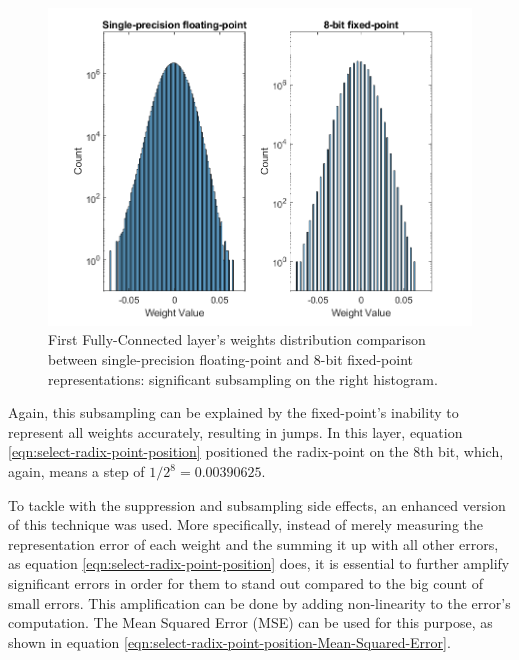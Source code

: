 \begin{figure} [H]
	\centering
	\includegraphics[scale=0.9]{../Images/Weights-distributions/original-vs-fixed8/weight-distribution-FC1.png}
	\decoRule
	\caption[First Fully-Connected layer's weights distribution comparison between single-precision floating-point and 8-bit fixed-point representations]{First Fully-Connected layer's weights distribution comparison between single-precision floating-point and 8-bit fixed-point representations: significant subsampling on the right histogram.}
	\label{fig:weight-distribution-comparison-FC1}
\end{figure}

Again, this subsampling can be explained by the fixed-point's inability to represent all weights accurately, resulting in jumps. In this layer, equation \ref{eqn:select-radix-point-position} positioned the radix-point on the 8th bit, which, again, means a step of $1/2^8 = 0.00390625$.

To tackle with the suppression and subsampling side effects, an enhanced version of this technique was used. More specifically, instead of merely measuring the representation error of each weight and the summing it up with all other errors, as equation \ref{eqn:select-radix-point-position} does, it is essential to further amplify significant errors in order for them to stand out compared to the big count of small errors. This amplification can be done by adding non-linearity to the error's computation. The Mean Squared Error (MSE) can be used for this purpose, as shown in equation \ref{eqn:select-radix-point-position-Mean-Squared-Error}.

